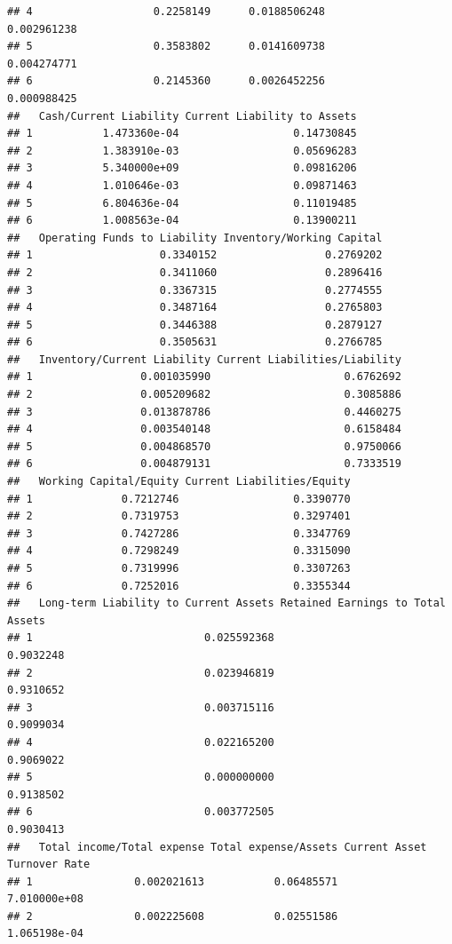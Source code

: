 \documentclass[
]{book}
\begin{document}
\begin{verbatim}
## 4                   0.2258149      0.0188506248                    0.002961238
## 5                   0.3583802      0.0141609738                    0.004274771
## 6                   0.2145360      0.0026452256                    0.000988425
##   Cash/Current Liability Current Liability to Assets
## 1           1.473360e-04                  0.14730845
## 2           1.383910e-03                  0.05696283
## 3           5.340000e+09                  0.09816206
## 4           1.010646e-03                  0.09871463
## 5           6.804636e-04                  0.11019485
## 6           1.008563e-04                  0.13900211
##   Operating Funds to Liability Inventory/Working Capital
## 1                    0.3340152                 0.2769202
## 2                    0.3411060                 0.2896416
## 3                    0.3367315                 0.2774555
## 4                    0.3487164                 0.2765803
## 5                    0.3446388                 0.2879127
## 6                    0.3505631                 0.2766785
##   Inventory/Current Liability Current Liabilities/Liability
## 1                 0.001035990                     0.6762692
## 2                 0.005209682                     0.3085886
## 3                 0.013878786                     0.4460275
## 4                 0.003540148                     0.6158484
## 5                 0.004868570                     0.9750066
## 6                 0.004879131                     0.7333519
##   Working Capital/Equity Current Liabilities/Equity
## 1              0.7212746                  0.3390770
## 2              0.7319753                  0.3297401
## 3              0.7427286                  0.3347769
## 4              0.7298249                  0.3315090
## 5              0.7319996                  0.3307263
## 6              0.7252016                  0.3355344
##   Long-term Liability to Current Assets Retained Earnings to Total Assets
## 1                           0.025592368                         0.9032248
## 2                           0.023946819                         0.9310652
## 3                           0.003715116                         0.9099034
## 4                           0.022165200                         0.9069022
## 5                           0.000000000                         0.9138502
## 6                           0.003772505                         0.9030413
##   Total income/Total expense Total expense/Assets Current Asset Turnover Rate
## 1                0.002021613           0.06485571                7.010000e+08
## 2                0.002225608           0.02551586                1.065198e-04

\end{verbatim}
\end{document}
